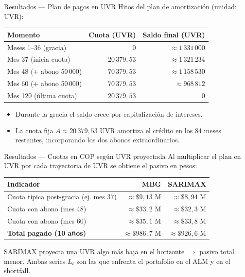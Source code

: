 \documentclass[10pt]{beamer}
\begin{document}
\begin{frame}{Resultados — Plan de pagos en UVR}
\small
Hitos del plan de amortización (unidad: UVR):

\begin{center}
\renewcommand{\arraystretch}{1.2}
\begin{tabular}{lrr}
\hline
\textbf{Momento} & \textbf{Cuota (UVR)} & \textbf{Saldo final (UVR)} \\
\hline
Meses 1--36 (gracia)     & \(0\)           & \(\approx 1\,331\,000\) \\
Mes 37 (inicia cuota)    & \(20\,379{,}53\)& \(\approx 1\,321\,234\) \\
Mes 48 (+ abono 50\,000) & \(70\,379{,}53\)& \(\approx 1\,158\,530\) \\
Mes 60 (+ abono 50\,000) & \(70\,379{,}53\)& \(\approx 968\,812\) \\
Mes 120 (última cuota)   & \(20\,379{,}53\)& \(0\) \\
\hline
\end{tabular}
\end{center}

\vspace{0.2cm}
\begin{itemize}
    \item Durante la gracia el saldo crece por capitalización de intereses.
    \item La cuota fija \(A \approx 20\,379{,}53\) UVR amortiza el crédito en los 84 meses restantes,
          incorporando los dos abonos extraordinarios.
\end{itemize}
\end{frame}


\begin{frame}{Resultados — Cuotas en COP según UVR proyectada}
\small
Al multiplicar el plan en UVR por cada trayectoria de UVR se obtiene el pasivo en pesos:

\begin{center}
\renewcommand{\arraystretch}{1.2}
\begin{tabular}{lrr}
\hline
\textbf{Indicador} & \textbf{MBG} & \textbf{SARIMAX} \\
\hline
Cuota típica post-gracia (ej. mes 37) & \(\approx \$9{,}13\) M & \(\approx \$8{,}94\) M \\
Cuota con abono (mes 48)              & \(\approx \$33{,}2\) M & \(\approx \$32{,}3\) M \\
Cuota con abono (mes 60)              & \(\approx \$35{,}1\) M & \(\approx \$33{,}8\) M \\
\textbf{Total pagado (10 años)}       & \(\approx \$986{,}7\) M & \(\approx \$926{,}6\) M \\
\hline
\end{tabular}
\end{center}

\vspace{0.15cm}
SARIMAX proyecta una UVR algo más baja en el horizonte \(\Rightarrow\) pasivo total menor.
Ambas series \(L_t\) son las que enfrenta el portafolio en el ALM y en el shortfall.
\end{frame}
\end{document}
